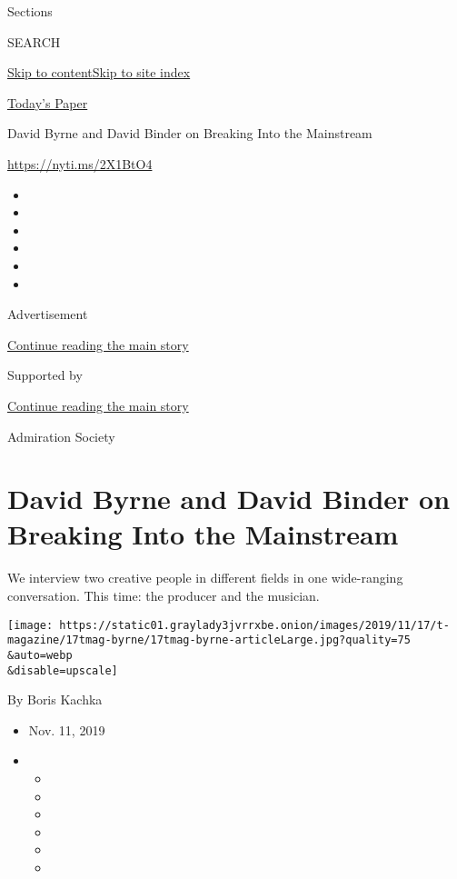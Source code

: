 Sections

SEARCH

\protect\hyperlink{site-content}{Skip to
content}\protect\hyperlink{site-index}{Skip to site index}

\href{https://myaccount.nytimes3xbfgragh.onion/auth/login?response_type=cookie\&client_id=vi}{}

\href{https://www.nytimes3xbfgragh.onion/section/todayspaper}{Today's
Paper}

David Byrne and David Binder on Breaking Into the Mainstream

\url{https://nyti.ms/2X1BtO4}

\begin{itemize}
\item
\item
\item
\item
\item
\item
\end{itemize}

Advertisement

\protect\hyperlink{after-top}{Continue reading the main story}

Supported by

\protect\hyperlink{after-sponsor}{Continue reading the main story}

Admiration Society

\hypertarget{david-byrne-and-david-binder-on-breaking-into-the-mainstream}{%
\section{David Byrne and David Binder on Breaking Into the
Mainstream}\label{david-byrne-and-david-binder-on-breaking-into-the-mainstream}}

We interview two creative people in different fields in one wide-ranging
conversation. This time: the producer and the musician.

\texttt{[image: https://static01.graylady3jvrrxbe.onion/images/2019/11/17/t-magazine/17tmag-byrne/17tmag-byrne-articleLarge.jpg?quality=75\\\&auto=webp\\\&disable=upscale]}

By Boris Kachka

\begin{itemize}
\item
  Nov. 11, 2019
\item
  \begin{itemize}
  \item
  \item
  \item
  \item
  \item
  \item
  \end{itemize}
\end{itemize}

